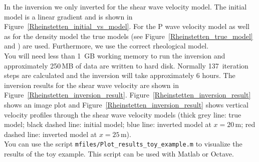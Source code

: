 In the inversion we only inverted for the shear wave velocity model. The initial model is a linear gradient and is shown in Figure~\ref{Rheinstetten_initial_vs_model}.  For the P wave velocity model as well as for the density model the true models (see Figure~\ref{Rheinstetten_true_model} and ) are used. Furthermore, we use the correct rheological model.\\

You will need less than 1~GB working memory to run the inversion and approximately 250\,MB of data are written to hard disk. Normally 137~iteration steps are calculated and the inversion will take approximately 6 hours. The inversion results for the shear wave velocity are shown in Figure~\ref{Rheinstetten_inversion_result}. Figure~\ref{Rheinstetten_inversion_result} shows an image plot and Figure~\ref{Rheinstetten_inversion_result} shows vertical velocity profiles through the shear wave velocity models (thick grey line: true model; black dashed line: initial model; blue line: inverted model at $x=20$\,m; red dashed line: inverted model at $x=25$\,m).\\

You can use the script \texttt{mfiles/Plot\_results\_toy\_example.m} to visualize the results of the toy example. This script can be used with Matlab or Octave.


